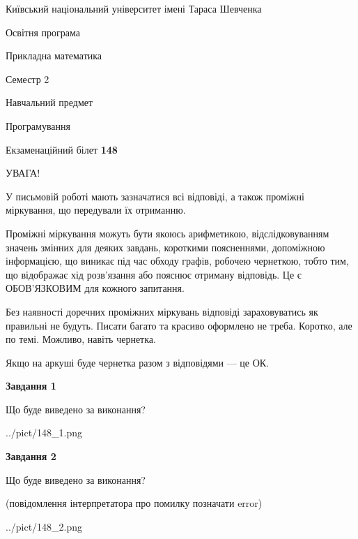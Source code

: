 \documentclass[12pt, ukrainian]{article}
\begin{document}
{{\begin {small}\par
{ \center  Київський національний університет імені Тараса Шевченка \par}
{\parbox {5 cm}{Освітня програма \hfill}{\parbox {7 cm}{Прикладна математика\hfill}}\parbox {6 cm}{\hfill Семестр 2}}\par
{\parbox {5 cm} {Навчальний предмет \hfill}\parbox {7 cm}{Програмування \hfill}\parbox {6cm}{\hfill}\par}\vspace{-7pt} \end{small}}{\center Екзаменаційний білет \No \textbf
{ 148 }\par}}
{
\begin {large}
УВАГА!

У письмовій роботі мають зазначатися всі відповіді, а також проміжні міркування, що передували їх отриманню.

Проміжні міркування можуть бути якоюсь арифметикою, відслідковуванням зна\-чень змінних для деяких завдань,
короткими поясненнями, допоміжною інформацією, що виникає під час обходу графів, робочею чернеткою,
тобто тим, що відображає хід розв’язання або пояснює отриману відповідь.
Це є ОБОВ’ЯЗКОВИМ для кожного запитання.

Без наявності доречних проміжних міркувань відповіді зараховуватись як правиль\-ні не будуть.
Писати багато та красиво оформлено не треба. Коротко, але по темі. Можли\-во, навіть чернетка.

Якщо на аркуші буде чернетка разом з відповідями --- це ОК.

\newpage

{\begin {center}\textbf{Завдання 1}\end {center}}\par
Що буде виведено за виконання?\par
\begin{center}
	{../pict/148_1.png}
\end{center}
\newpage

{\begin {center}\textbf{Завдання 2}\end {center}}\par
Що буде виведено за виконання?\par
 (повідомлення інтерпретатора про помилку позначати error)\par
\begin{center}
	{../pict/148_2.png}
\end{center}
\newpage


\end{large}}
\end{document}
